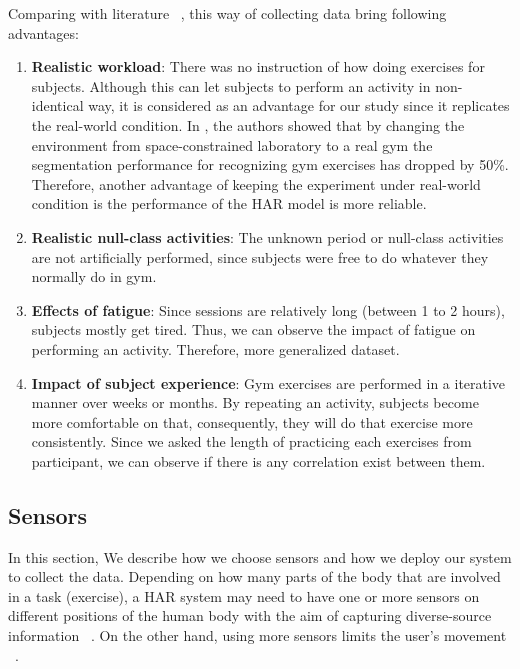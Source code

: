 \documentclass[journal,article,submit,moreauthors,pdftex]{Definitions/mdpi}
\begin{document}
Comparing with literature ~\cite{morris2014recofit, soro2019recognition, s140610146, anguita2013public}, this way of collecting data bring following advantages:

\begin{enumerate}
	
	\item \textbf{Realistic workload}: There was no instruction of how doing exercises for subjects. Although this can let subjects to perform an activity in non-identical way, it is considered as an advantage for our study since it replicates the real-world condition. In \cite{morris2014recofit}, the authors showed that by changing the environment from space-constrained laboratory to a real gym the segmentation performance for recognizing gym exercises has dropped by 50\%. Therefore, another advantage of keeping the experiment under real-world condition is the performance of the HAR model is more reliable.	
	\item \textbf{Realistic null-class activities}:	The unknown period or null-class activities are not artificially performed, since subjects were free to do whatever they normally do in gym.	
	\item \textbf{Effects of fatigue}: Since sessions are relatively long (between 1 to 2 hours), subjects mostly get tired. Thus, we can observe the impact of fatigue on performing an activity. Therefore, more generalized dataset.
	
	\item \textbf{Impact of subject experience}: Gym exercises are performed in a iterative manner over weeks or months. By repeating an activity, subjects become more comfortable on that, consequently, they will do that exercise more consistently. Since we asked the length of practicing each exercises from participant, we can observe if there is any correlation exist between them.
\end{enumerate}

\subsection{Sensors} 

In this section, We describe how we choose sensors and how we deploy our system to collect the data. Depending on how many parts of the body that are involved in a task (exercise), a HAR system may need to have one or more sensors on different positions of the human body with the aim of capturing diverse-source information ~\cite{wang2019survey}. On the other hand, using more sensors limits the user's movement ~\cite{de2018comparative}. 
\end{document}
